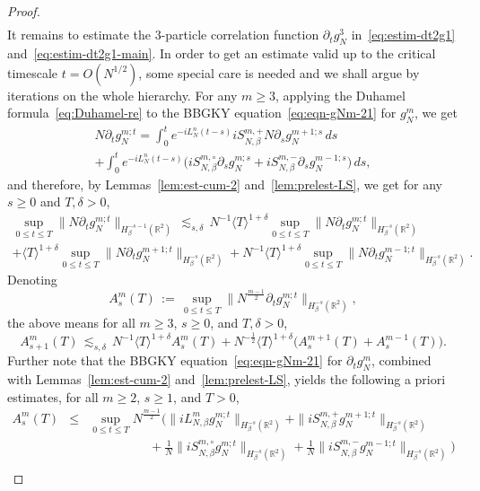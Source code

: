 \documentclass[a4paper,11pt,reqno,noindent]{amsart}
\theoremstyle{plain}
\numberwithin{equation}{section}
\newcommand{\R}{\mathbb R}
\newcommand{\3}{|\!|\!|}
\begin{document}
\begin{proof}
\begin{multline}
\end{multline}
It remains to estimate the $3$-particle correlation function $\partial_tg_N^3$ in~\eqref{eq:estim-dt2g1} and~\eqref{eq:estim-dt2g1-main}. In order to get an estimate valid up to the critical timescale $t=O(N^{1/2})$, some special care is needed and we shall argue by iterations on the whole hierarchy.
For any $m\ge3$, applying the Duhamel formula~\eqref{eq:Duhamel-re} to the BBGKY equation~\eqref{eq:eqn-gNm-21} for $g_N^m$, we get
\begin{multline*}
N\partial_tg_N^{m;t}=\int_0^te^{-iL_N^n(t-s)}iS_{N,\beta}^{m,+}N\partial_sg_N^{m+1;s}\,ds\\
+\int_0^te^{-iL_N^n(t-s)}\Big(iS_{N,\beta}^{m,\circ}\partial_sg_N^{m;s}+iS_{N,\beta}^{m,-}\partial_sg_N^{m-1;s}\Big)\,ds,
\end{multline*}
and therefore, by Lemmas~\ref{lem:est-cum-2} and~\ref{lem:prelest-LS}, we get for any $s\ge0$ and $T,\delta>0$,
\begin{multline*}
\sup_{0\le t\le T}\|N\partial_tg_N^{m;t}\|_{H^{-s-1}_\beta(\R^2)}\,\lesssim_{s,\delta}\,N^{-1}\langle T\rangle^{1+\delta}\sup_{0\le t\le T}\|N\partial_tg_N^{m;t}\|_{H^{-s}_\beta(\R^2)}\\
+\langle T\rangle^{1+\delta}\sup_{0\le t\le T}\|N\partial_tg_N^{m+1;t}\|_{H^{-s}_\beta(\R^2)}
+N^{-1}\langle T\rangle^{1+\delta}\sup_{0\le t\le T}\|N\partial_tg_N^{m-1;t}\|_{H^{-s}_\beta(\R^2)}.
\end{multline*}
Denoting
\begin{equation}\label{eq:notation-Asm}
A_{s}^m(T)\,:=\,\sup_{0\le t\le T}\|N^{\frac{m-1}2}\partial_tg_N^{m;t}\|_{H^{-s}_\beta(\R^2)},
\end{equation}
the above means for all $m\ge3$, $s\ge0$, and $T,\delta>0$,
\begin{equation}\label{eq:toiterate-Asm}
A_{s+1}^m(T)\,\lesssim_{s,\delta}\,N^{-1}\langle T\rangle^{1+\delta}A_s^m(T)
+N^{-\frac12}\langle T\rangle^{1+\delta}\big(A_s^{m+1}(T)+A_s^{m-1}(T)\big).
\end{equation}
Further note that the BBGKY equation~\eqref{eq:eqn-gNm-21} for $\partial_tg_N^m$, combined with Lemmas~\ref{lem:est-cum-2} and~\ref{lem:prelest-LS}, yields the following a priori estimates, for all $m\ge2$, $s\ge1$, and $T>0$,
\begin{eqnarray}
A_s^m(T)&\le&\sup_{0\le t\le T}N^{\frac{m-1}2}\Big( \|iL_{N,\beta}^mg^{m;t}_N\|_{H^{-s}_\beta(\R^2)}+\|iS_{N,\beta}^{m,+}g_N^{m+1;t}\|_{H^{-s}_\beta(\R^2)}\nonumber\\
&&\hspace{2cm}+\tfrac1N\|iS^{m,\circ}_{N,\beta}g_N^{m;t}\|_{H^{-s}_\beta(\R^2)}+\tfrac1N\|iS_{N,\beta}^{m,-}g_N^{m-1;t}\|_{H^{-s}_\beta(\R^2)}\Big)\nonumber\\

\end{eqnarray}
\end{proof}
\end{document}
